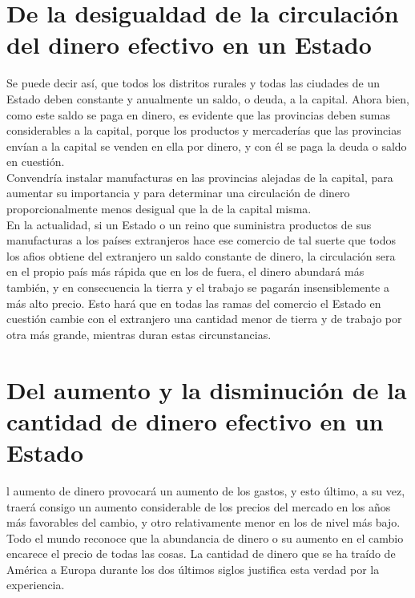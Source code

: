 \documentclass[10pt]{article}
\begin{document}
\begin{multicols}{1}
\section*{De la desigualdad de la circulación del dinero efectivo en un Estado}
Se puede decir así, que todos los distritos rurales y todas las ciudades de un Estado deben constante y anualmente un saldo, o deuda, a la capital. Ahora bien, como este saldo se paga en dinero, es evidente que las provincias deben sumas considerables a la capital, porque los productos y mercaderías que las provincias envían a la capital se venden en ella por dinero, y con él se paga la deuda o saldo en cuestión.\\
Convendría instalar manufacturas en las provincias alejadas de la capital, para aumentar su importancia y para determinar una circulación de dinero proporcionalmente menos desigual que la de la capital misma.\\
En la actualidad, si un Estado o un reino que suministra productos de sus manufacturas a los países extranjeros hace ese comercio de tal suerte que todos los afios obtiene del extranjero un saldo constante de dinero, la circulación sera en el propio país más rápida que en los de fuera, el dinero abundará más también, y en consecuencia la tierra y el trabajo se pagarán insensiblemente a más alto precio. Esto hará que en todas las ramas del comercio el Estado en cuestión cambie con el extranjero una cantidad menor de tierra y de trabajo por otra más grande, mientras duran estas circunstancias.
\section*{Del aumento y la disminución de la cantidad de dinero efectivo en un Estado}
l aumento de dinero provocará un aumento de los gastos, y esto último, a su vez, traerá consigo un aumento considerable de los precios del mercado en los años más favorables del cambio, y otro relativamente menor en los de nivel más bajo. Todo el mundo reconoce que la abundancia de dinero o su aumento en el cambio encarece el precio de todas las cosas. La cantidad de dinero que se ha traído de América a Europa durante los dos últimos siglos justifica esta verdad por la experiencia.

\end{multicols}
\end{document}
